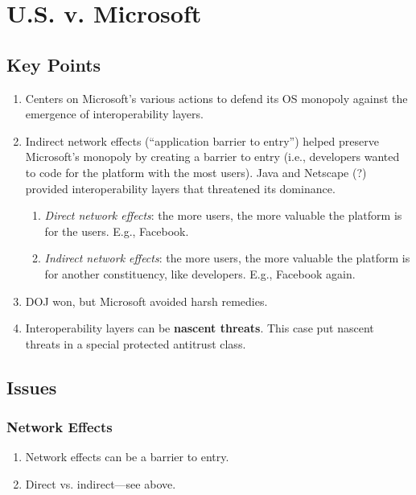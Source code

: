 \section{U.S. v. Microsoft}

\subsection{Key Points}

\begin{enumerate}
    \item Centers on Microsoft's various actions to defend its OS monopoly 
    against the emergence of interoperability layers.
    \item Indirect network effects (``application barrier to entry'') helped 
    preserve Microsoft's monopoly by creating a barrier to entry (i.e., 
    developers wanted to code for the platform with the most users). Java and 
    Netscape (?) provided interoperability layers that threatened its 
    dominance.
    \begin{enumerate}
        \item \emph{Direct network effects}: the more users, the more valuable 
        the platform is for the users. E.g., Facebook.
        \item \emph{Indirect network effects}: the more users, the more 
        valuable the platform is for another constituency, like developers. 
        E.g., Facebook again.
    \end{enumerate}
    \item DOJ won, but Microsoft avoided harsh remedies.
    \item Interoperability layers can be \textbf{nascent threats}. This case 
    put nascent threats in a special protected antitrust class.
\end{enumerate}

\subsection{Issues}
\label{sub:msft-issues}

\subsubsection{Network Effects}

\begin{enumerate}
    \item Network effects can be a barrier to entry.
    \item Direct vs. indirect---see above.
\end{enumerate}

